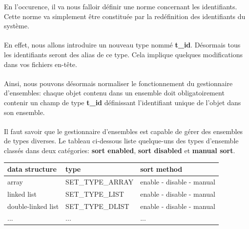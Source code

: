 \documentclass[10pt,a4wide]{article}
\begin{document}
En l'occurence, il va nous falloir d\'efinir une norme concernant les
identifiants. Cette norme va simplement \^etre constitu\'ee par la
red\'efinition des identifiants du syst\`eme.

\paragraph{}

En effet, nous allons introduire un nouveau type nomm\'e \textbf{t\_id}.
D\'esormais tous les identifiants seront des alias de ce type. Cela implique
quelques modifications dans vos fichiers en-t\^ete.

\paragraph{}

Ainsi, nous pouvons d\'esormais normaliser le fonctionnement du gestionnaire
d'ensembles: chaque objet contenu dans un ensemble doit obligatoirement
contenir un champ de type \textbf{t\_id} d\'efinissant l'identifiant unique
de l'objet dans son ensemble.

\paragraph{}

Il faut savoir que le gestionnaire d'ensembles est capable de g\'erer
des ensembles de types diverses. Le tableau ci-dessous liste quelque-uns
des types d'ensemble class\'es dans deux cat\'egories: \textbf{sort enabled},
\textbf{sort disabled} et \textbf{manual sort}.

\begin{center}

\begin{tabular}{|p{4cm}|p{4cm}|p{5cm}|}

\hline

\textbf{data structure} & \textbf{type} & \textbf{sort method} \\

\hline

array & SET\_TYPE\_ARRAY & enable - disable - manual \\

\hline

linked list & SET\_TYPE\_LIST & enable - disable - manual \\

\hline

double-linked list & SET\_TYPE\_DLIST & enable - disable - manual \\

\hline

... & ... & ... \\

\hline

\end{tabular}

\end{center}
\end{document}
